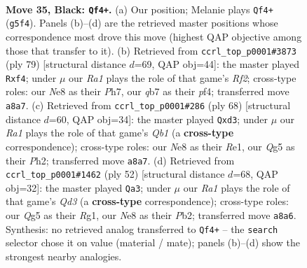 \documentclass[11pt]{article}
\begin{document}
\clearpage

\begin{figure}[p]\centering
\begin{subfigure}{0.46\textwidth}\centering
\resizebox{\linewidth}{!}{%
\newchessgame
\chessboard[
  setfen={rn2nk2/1Q5p/7p/p1P2pqP/P7/1N6/5K2/RN6 b - - 3 35},
  showmover=false,
  pgfstyle=straightmove, color=movearrow, markmove={g5-f4}
]}
\caption{}
\end{subfigure}\hfill
\begin{subfigure}{0.46\textwidth}\centering
\resizebox{\linewidth}{!}{%
\newchessgame
\chessboard[
  setfen={7k/p4r1p/4Q3/1P2n3/PP1q1P2/8/4p1NP/6RK b - - 3 40},
  showmover=false,
  pgfstyle=straightmove, color=movearrow, markmove={f7-f4}
]}
\caption{}
\end{subfigure}
\\[4pt]
\begin{subfigure}{0.46\textwidth}\centering
\resizebox{\linewidth}{!}{%
\newchessgame
\chessboard[
  setfen={3r2k1/6p1/7p/2p5/b3Np2/Nn1q1P2/1P4PP/1Q2R1K1 w - - 0 35},
  showmover=false,
  pgfstyle=straightmove, color=movearrow, markmove={b1-d3}
]}
\caption{}
\end{subfigure}\hfill
\begin{subfigure}{0.46\textwidth}\centering
\resizebox{\linewidth}{!}{%
\newchessgame
\chessboard[
  setfen={r5k1/pp4n1/1npp4/5qBp/3P4/3Q1P2/PPN4P/6RK w - - 3 27},
  showmover=false,
  pgfstyle=straightmove, color=movearrow, markmove={d3-a3}
]}
\caption{}
\end{subfigure}
\caption{\textbf{Move 35, Black: \texttt{Qf4+}.} (a) Our position; Melanie plays \texttt{Qf4+} (\texttt{g5f4}). Panels (b)--(d) are the retrieved master positions whose correspondence most drove this move (highest QAP objective among those that transfer to it). (b) Retrieved from \texttt{ccrl\_top\_p0001\#3873} (ply 79) [structural distance $d$=69, QAP obj=44]: the master played \texttt{Rxf4}; under $\mu$ our \emph{Ra1} plays the role of that game's \emph{Rf2}; cross-type roles: our \emph{N}e8 as their \emph{P}h7, our \emph{q}b7 as their \emph{p}f4; transferred move \texttt{a8a7}. (c) Retrieved from \texttt{ccrl\_top\_p0001\#286} (ply 68) [structural distance $d$=60, QAP obj=34]: the master played \texttt{Qxd3}; under $\mu$ our \emph{Ra1} plays the role of that game's \emph{Qb1} (a \textbf{cross-type} correspondence); cross-type roles: our \emph{N}e8 as their \emph{R}e1, our \emph{Q}g5 as their \emph{P}h2; transferred move \texttt{a8a7}. (d) Retrieved from \texttt{ccrl\_top\_p0001\#1462} (ply 52) [structural distance $d$=68, QAP obj=32]: the master played \texttt{Qa3}; under $\mu$ our \emph{Ra1} plays the role of that game's \emph{Qd3} (a \textbf{cross-type} correspondence); cross-type roles: our \emph{Q}g5 as their \emph{R}g1, our \emph{N}e8 as their \emph{P}b2; transferred move \texttt{a8a6}. Synthesis: no retrieved analog transferred to \texttt{Qf4+} -- the \texttt{search} selector chose it on value (material / mate); panels (b)--(d) show the strongest nearby analogies.}
\label{fig:thought-m69}
\end{figure}
\end{document}

